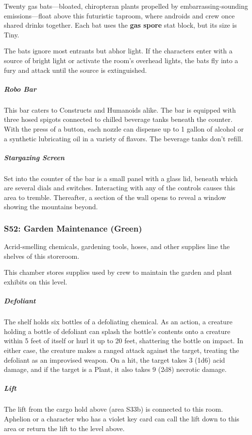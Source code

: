 \documentclass[10pt,a4paper,twoside,bg=print,twocolumn,openany,nodeprecatedcode]{dndbook}
\begin{document}
Twenty gas bats—bloated, chiropteran plants propelled by embarrassing-sounding emissions—float above this futuristic taproom, where androids and crew once shared drinks together. Each bat uses the \textbf{gas spore} stat block, but its size is Tiny.

The bats ignore most entrants but abhor light. If the characters enter with a source of bright light or activate the room's overhead lights, the bats fly into a fury and attack until the source is extinguished.

\subparagraph{Robo Bar}
This bar caters to Constructs and Humanoids alike. The bar is equipped with three hosed spigots connected to chilled beverage tanks beneath the counter. With the press of a button, each nozzle can dispense up to 1 gallon of alcohol or a synthetic lubricating oil in a variety of flavors. The beverage tanks don't refill.

\subparagraph{Stargazing Screen}
Set into the counter of the bar is a small panel with a glass lid, beneath which are several dials and switches. Interacting with any of the controls causes this area to tremble. Thereafter, a section of the wall opens to reveal a window showing the mountains beyond.

\subsubsection{S52: Garden Maintenance (Green)}
\begin{DndReadAloud}{}
Acrid-smelling chemicals, gardening tools, hoses, and other supplies line the shelves of this storeroom.

\end{DndReadAloud}

This chamber stores supplies used by crew to maintain the garden and plant exhibits on this level.

\subparagraph{Defoliant}
The shelf holds six bottles of a defoliating chemical. As an action, a creature holding a bottle of defoliant can splash the bottle's contents onto a creature within 5 feet of itself or hurl it up to 20 feet, shattering the bottle on impact. In either case, the creature makes a ranged attack against the target, treating the defoliant as an improvised weapon. On a hit, the target takes 3 (1d6) acid damage, and if the target is a Plant, it also takes 9 (2d8) necrotic damage.

\subparagraph{Lift}
The lift from the cargo hold above (area S33b) is connected to this room. Aphelion or a character who has a violet key card can call the lift down to this area or return the lift to the level above.
\end{document}
